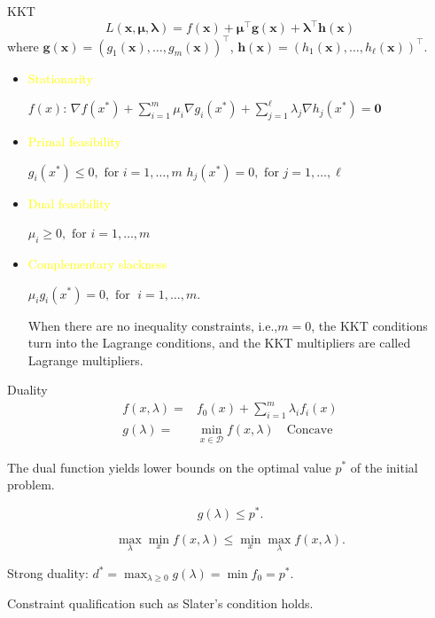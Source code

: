     \begin{frame}{KKT}
      \[L(\mathbf {x} ,\mathbf {\mu } ,\mathbf {\lambda } )=f(\mathbf {x} )+\mathbf {\mu } ^{\top }\mathbf {g} (\mathbf {x} )+\mathbf {\lambda } ^{\top }\mathbf {h} (\mathbf {x} ) \]
      \quad where $ \mathbf {g} (\mathbf {x} )=\left(g_{1}(\mathbf {x} ),\ldots ,g_{m}(\mathbf {x} )\right)^{\top } $, $ \mathbf {h} (\mathbf {x} )=\left(h_{1}(\mathbf {x} ),\ldots ,h_{\ell }(\mathbf {x} )\right)^{\top }$.

      \begin{itemize}
        \item \textcolor{yellow}{Stationarity}

        $ f(x) $: $ \nabla f(x^{*})+\sum _{i=1}^{m}\mu _{i}\nabla g_{i}(x^{*})+\sum _{j=1}^{\ell }\lambda _{j}\nabla h_{j}(x^{*})=\mathbf {0}$
        \item \textcolor{yellow}{Primal feasibility}

        $ g_{i}(x^{*})\leq 0,{\text{ for }}i=1,\ldots ,m $
        $ h_{j}(x^{*})=0,{\text{ for }}j=1,\ldots ,\ell \,\! $
        \item \textcolor{yellow}{Dual feasibility}

        $\mu _{i}\geq 0,{\text{ for }}i=1,\ldots ,m $
        \item \textcolor{yellow}{Complementary slackness}

        $ \mu _{i}g_{i}(x^{*})=0,{\text{ for }}\;i=1,\ldots ,m. $

        When there are no inequality constraints, i.e.,$ m=0 $, the KKT conditions turn into the Lagrange conditions, and the KKT multipliers are called Lagrange multipliers.
      \end{itemize}
    \end{frame}

    \begin{frame}{Duality}
      \begin{equation*}
        \begin{align}
        f(x,\lambda)=& f_{0}(x)+\sum_{i=1}^{m}\lambda_{i}f_{i}(x) \\
        g(\lambda)=& \min_{x\in {\mathcal {D}}}  f(x,\lambda) \quad \text{Concave}
      \end{align}
      \end{equation*}

      The dual function yields lower bounds on the optimal value $p^{*}$
      of the initial problem.

      \[ g(\lambda)\leq p^{*} .\]

      \[\max_\lambda \min_x f(x,\lambda) \leq \min_x \max_\lambda f(x,\lambda).\]

      Strong duality: $ d^{*}=\max _{\lambda \geq 0}g(\lambda)=\min f_{0}=p^{*}$.

      Constraint qualification such as Slater's condition holds.
    \end{frame}

